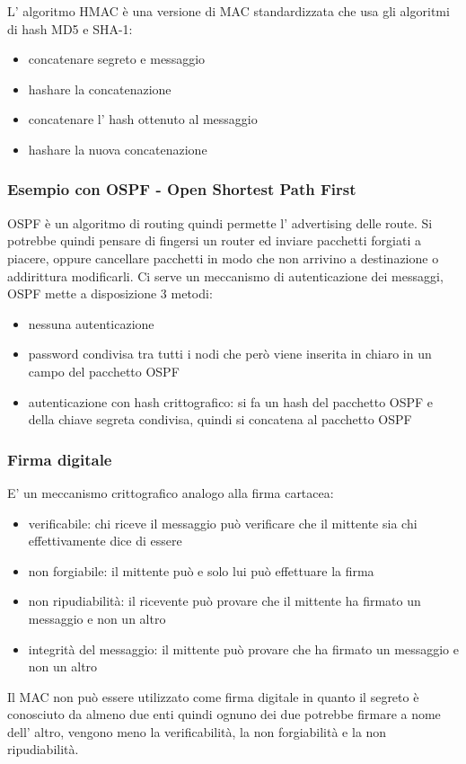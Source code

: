 L' algoritmo HMAC è una versione di MAC standardizzata che usa gli algoritmi di hash MD5 e SHA-1:
\begin{itemize}
    \item concatenare segreto e messaggio
    \item hashare la concatenazione
    \item concatenare l' hash ottenuto al messaggio
    \item hashare la nuova concatenazione
\end{itemize}

\subsubsection{Esempio con OSPF - Open Shortest Path First}
OSPF è un algoritmo di routing quindi permette l' advertising delle route.
Si potrebbe quindi pensare di fingersi un router ed inviare pacchetti forgiati a piacere, oppure cancellare pacchetti in modo che non arrivino a destinazione o addirittura modificarli.
Ci serve un meccanismo di autenticazione dei messaggi, OSPF mette a disposizione 3 metodi:
\begin{itemize}
    \item nessuna autenticazione
    \item password condivisa tra tutti i nodi che però viene inserita in chiaro in un campo del pacchetto OSPF
    \item autenticazione con hash crittografico: si fa un hash del pacchetto OSPF e della chiave segreta condivisa, quindi si concatena al pacchetto OSPF
\end{itemize}

\subsubsection{Firma digitale}
E' un meccanismo crittografico analogo alla firma cartacea:
\begin{itemize}
    \item verificabile: chi riceve il messaggio può verificare che il mittente sia chi effettivamente dice di essere
    
    \item non forgiabile: il mittente può e solo lui può effettuare la firma
    
    \item non ripudiabilità: il ricevente può provare che il mittente ha firmato un messaggio e non un altro
    
    \item integrità del messaggio: il mittente può provare che ha firmato un messaggio e non un altro
\end{itemize}
Il MAC non può essere utilizzato come firma digitale in quanto il segreto è conosciuto da almeno due enti quindi ognuno dei due potrebbe firmare a nome dell' altro, vengono meno la verificabilità, la non forgiabilità e la non ripudiabilità.

